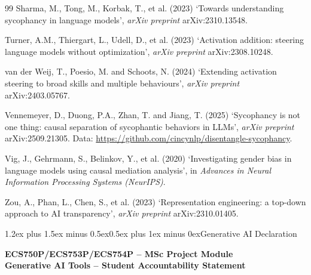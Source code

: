\documentclass[conference]{IEEEtran}
\makeatletter
\renewcommand{\section}{\@startsection{section}{1}{\z@}%
  {1.2ex plus 1.5ex minus 0.5ex}{0.5ex plus 1ex minus 0ex}{\normalfont\normalsize\centering\scshape}}
\makeatother
\begin{document}
\begin{thebibliography}{99}
Sharma, M., Tong, M., Korbak, T., et al. (2023) `Towards understanding sycophancy
in language models', \textit{arXiv preprint} arXiv:2310.13548.

Turner, A.M., Thiergart, L., Udell, D., et al. (2023) `Activation addition:
steering language models without optimization', \textit{arXiv preprint}
arXiv:2308.10248.

van der Weij, T., Poesio, M. and Schoots, N. (2024) `Extending activation
steering to broad skills and multiple behaviours', \textit{arXiv preprint}
arXiv:2403.05767.

Vennemeyer, D., Duong, P.A., Zhan, T. and Jiang, T. (2025) `Sycophancy is not
one thing: causal separation of sycophantic behaviors in LLMs',
\textit{arXiv preprint} arXiv:2509.21305. Data:
\url{https://github.com/cincynlp/disentangle-sycophancy}.

Vig, J., Gehrmann, S., Belinkov, Y., et al. (2020) `Investigating gender bias in
language models using causal mediation analysis', in \textit{Advances in Neural
Information Processing Systems (NeurIPS)}.

Zou, A., Phan, L., Chen, S., et al. (2023) `Representation engineering: a
top-down approach to AI transparency', \textit{arXiv preprint} arXiv:2310.01405.

\end{thebibliography}

\clearpage
\onecolumn
\appendices

\section{Generative AI Declaration}
\label{app:genai}
\begingroup
\setlength{\parindent}{0pt}
\setlength{\parskip}{0.5em}
\renewcommand{\arraystretch}{1.3}

\begin{center}
\textbf{ECS750P/ECS753P/ECS754P -- MSc Project Module}\\
\textbf{Generative AI Tools -- Student Accountability Statement}
\end{center}
\end{document}
